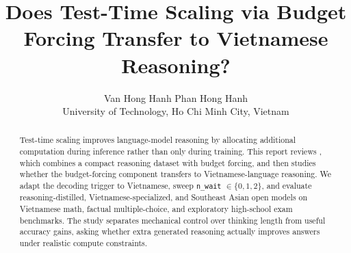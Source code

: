 \documentclass[10pt,a4paper,twocolumn]{article}
\title{Does Test-Time Scaling via Budget Forcing Transfer to Vietnamese Reasoning?}
\author{Van Hong Hanh \quad Phan Hong Hanh\\
University of Technology, Ho Chi Minh City, Vietnam}
\date{}
\begin{document}
\maketitle

\begin{abstract}
Test-time scaling improves language-model reasoning by allocating additional computation during inference rather than only during training. This report reviews \citet{muennighoff2025s1}, which combines a compact reasoning dataset with budget forcing, and then studies whether the budget-forcing component transfers to Vietnamese-language reasoning. We adapt the decoding trigger to Vietnamese, sweep \texttt{n\_wait} $\in \{0,1,2\}$, and evaluate reasoning-distilled, Vietnamese-specialized, and Southeast Asian open models on Vietnamese math, factual multiple-choice, and exploratory high-school exam benchmarks. The study separates mechanical control over thinking length from useful accuracy gains, asking whether extra generated reasoning actually improves answers under realistic compute constraints.
\end{abstract}









\balance


\end{document}
